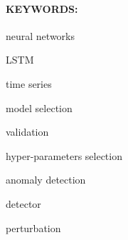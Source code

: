 \paragraph{KEYWORDS:}
\begin{itemize*}[label=,itemsep=1em,itemjoin=\hspace{1em}]
  \item neural networks
  \item LSTM
  \item time series
  \item model selection
  \item validation
  \item hyper-parameters selection
  \item anomaly detection
  \item detector
  \item perturbation
\end{itemize*}

\endinput
